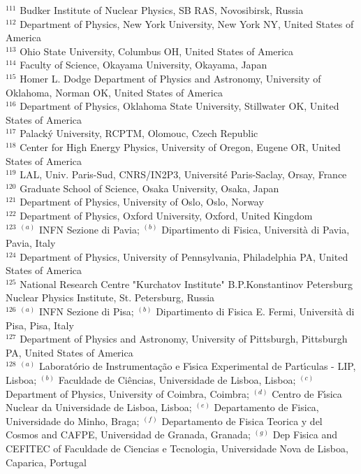 \begin{flushleft}
$^{111}$ Budker Institute of Nuclear Physics, SB RAS, Novosibirsk, Russia\\
$^{112}$ Department of Physics, New York University, New York NY, United States of America\\
$^{113}$ Ohio State University, Columbus OH, United States of America\\
$^{114}$ Faculty of Science, Okayama University, Okayama, Japan\\
$^{115}$ Homer L. Dodge Department of Physics and Astronomy, University of Oklahoma, Norman OK, United States of America\\
$^{116}$ Department of Physics, Oklahoma State University, Stillwater OK, United States of America\\
$^{117}$ Palack{\'y} University, RCPTM, Olomouc, Czech Republic\\
$^{118}$ Center for High Energy Physics, University of Oregon, Eugene OR, United States of America\\
$^{119}$ LAL, Univ. Paris-Sud, CNRS/IN2P3, Universit{\'e} Paris-Saclay, Orsay, France\\
$^{120}$ Graduate School of Science, Osaka University, Osaka, Japan\\
$^{121}$ Department of Physics, University of Oslo, Oslo, Norway\\
$^{122}$ Department of Physics, Oxford University, Oxford, United Kingdom\\
$^{123}$ $^{(a)}$ INFN Sezione di Pavia; $^{(b)}$ Dipartimento di Fisica, Universit{\`a} di Pavia, Pavia, Italy\\
$^{124}$ Department of Physics, University of Pennsylvania, Philadelphia PA, United States of America\\
$^{125}$ National Research Centre "Kurchatov Institute" B.P.Konstantinov Petersburg Nuclear Physics Institute, St. Petersburg, Russia\\
$^{126}$ $^{(a)}$ INFN Sezione di Pisa; $^{(b)}$ Dipartimento di Fisica E. Fermi, Universit{\`a} di Pisa, Pisa, Italy\\
$^{127}$ Department of Physics and Astronomy, University of Pittsburgh, Pittsburgh PA, United States of America\\
$^{128}$ $^{(a)}$ Laborat{\'o}rio de Instrumenta{\c{c}}{\~a}o e F{\'\i}sica Experimental de Part{\'\i}culas - LIP, Lisboa; $^{(b)}$ Faculdade de Ci{\^e}ncias, Universidade de Lisboa, Lisboa; $^{(c)}$ Department of Physics, University of Coimbra, Coimbra; $^{(d)}$ Centro de F{\'\i}sica Nuclear da Universidade de Lisboa, Lisboa; $^{(e)}$ Departamento de Fisica, Universidade do Minho, Braga; $^{(f)}$ Departamento de Fisica Teorica y del Cosmos and CAFPE, Universidad de Granada, Granada; $^{(g)}$ Dep Fisica and CEFITEC of Faculdade de Ciencias e Tecnologia, Universidade Nova de Lisboa, Caparica, Portugal\\

\end{flushleft}
